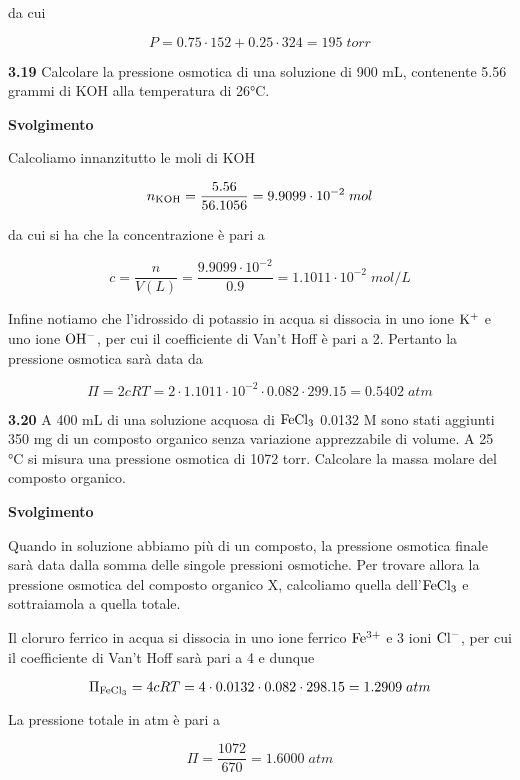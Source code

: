 da cui 

$$P=0.75 \cdot 152 + 0.25 \cdot 324=195\;torr$$

\vspace{0.2cm}\textbf{3.19} Calcolare la pressione osmotica di una soluzione di 900 mL, contenente 5.56 grammi di KOH alla temperatura di 26°C.

\vspace{0.2cm}\large\textbf{Svolgimento}\normalsize

\vspace{0.2cm}Calcoliamo innanzitutto le moli di KOH

$$n_{\rm KOH}=\frac{5.56}{56.1056}=9.9099 \cdot 10^{-2}\;mol$$

da cui si ha che la concentrazione è pari a

$$c=\frac{n}{V(L)}=\frac{9.9099 \cdot 10^{-2}}{0.9}=1.1011 \cdot 10^{-2}\;mol/L$$

Infine notiamo che l'idrossido di potassio in acqua si dissocia in uno ione $\rm K^+$ e uno ione $\rm OH^-$, per cui il coefficiente di Van't Hoff è pari a 2. Pertanto la pressione osmotica sarà data da

$$\Pi=2cRT
=2 \cdot 1.1011 \cdot 10^{-2} \cdot 0.082 \cdot 299.15
=0.5402\;atm$$

\vspace{0.2cm}\textbf{3.20} A 400 mL di una soluzione acquosa di $\rm FeCl_3$ 0.0132 M sono stati aggiunti 350 mg di un composto organico senza variazione apprezzabile di volume. A 25 °C si misura una pressione osmotica di 1072 torr. Calcolare la massa molare del composto organico.

\vspace{0.2cm}\large\textbf{Svolgimento}\normalsize

\vspace{0.2cm}Quando in soluzione abbiamo più di un composto, la pressione osmotica finale sarà data dalla somma delle singole pressioni osmotiche. Per trovare allora la pressione osmotica del composto organico X, calcoliamo quella dell'$\rm FeCl_3$ e sottraiamola a quella totale.

Il cloruro ferrico in acqua si dissocia in uno ione ferrico $\rm Fe^{3+}$ e 3 ioni $\rm Cl^-$, per cui il coefficiente di Van't Hoff sarà pari a 4 e dunque

$$\Pi_{\rm FeCl_3}=4cRT
=4 \cdot 0.0132 \cdot 0.082 \cdot 298.15
=1.2909\;atm$$

La pressione totale in atm è pari a

$$\Pi=\frac{1072}{670}=1.6000\;atm$$

